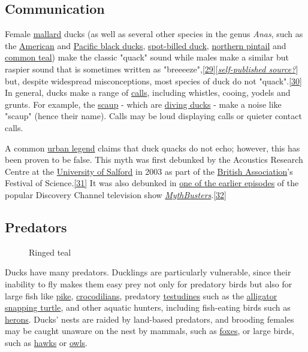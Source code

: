 \documentclass[11pt,a4paper]{article}
\begin{document}
\subsection{Communication}

Female \href{/wiki/Mallard}{mallard} ducks (as well as several other species in the genus \textit{Anas}, such as the \href{/wiki/American\_black\_duck}{American} and \href{/wiki/Pacific\_black\_duck}{Pacific black ducks}, \href{/wiki/Spot-billed\_duck}{spot-billed duck}, \href{/wiki/Northern\_pintail}{northern pintail} and \href{/wiki/Common\_teal}{common teal}) make the classic "quack" sound while males make a similar but raspier sound that is sometimes written as "breeeeze",\href{\#cite\_note-29}{[29]}[\href{/wiki/Wikipedia:Verifiability\#Self-published\_sources}{\textit{self-published source?}}] but, despite widespread misconceptions, most species of duck do not "quack".\href{\#cite\_note-30}{[30]} In general, ducks make a range of \href{/wiki/Bird\_vocalisation}{calls}, including whistles, cooing, yodels and grunts. For example, the \href{/wiki/Scaup}{scaup} - which are \href{/wiki/Diving\_duck}{diving ducks} - make a noise like "scaup" (hence their name). Calls may be loud displaying calls or quieter contact calls.

A common \href{/wiki/Urban\_legend}{urban legend} claims that duck quacks do not echo; however, this has been proven to be false. This myth was first debunked by the Acoustics Research Centre at the \href{/wiki/University\_of\_Salford}{University of Salford} in 2003 as part of the \href{/wiki/British\_Association}{British Association}'s Festival of Science.\href{\#cite\_note-31}{[31]} It was also debunked in \href{/wiki/MythBusters\_\%282003\_season\%29\#Does\_a\_Duck's\_Quack\_Echo?}{one of the earlier episodes} of the popular Discovery Channel television show \href{/wiki/MythBusters}{\textit{MythBusters}}.\href{\#cite\_note-32}{[32]}

\subsection{Predators}

\begin{figure}[h]
\caption{Ringed teal}
\end{figure}

Ducks have many predators. Ducklings are particularly vulnerable, since their inability to fly makes them easy prey not only for predatory birds but also for large fish like \href{/wiki/Esox}{pike}, \href{/wiki/Crocodilia}{crocodilians}, predatory \href{/wiki/Testudines}{testudines} such as the \href{/wiki/Alligator\_snapping\_turtle}{alligator snapping turtle}, and other aquatic hunters, including fish-eating birds such as \href{/wiki/Heron}{herons}. Ducks' nests are raided by land-based predators, and brooding females may be caught unaware on the nest by mammals, such as \href{/wiki/Fox}{foxes}, or large birds, such as \href{/wiki/Hawk}{hawks} or \href{/wiki/Owl}{owls}.
\end{document}
